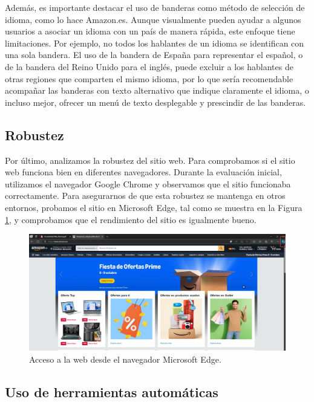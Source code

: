 \documentclass[letterpaper, 12pt]{report}
\begin{document}
Además, es importante destacar el uso de banderas como método de selección de idioma, como lo hace Amazon.es. Aunque visualmente pueden ayudar a algunos usuarios a asociar un idioma con un país de manera rápida, este enfoque tiene limitaciones. Por ejemplo, no todos los hablantes de un idioma se identifican con una sola bandera. El uso de la bandera de España para representar el español, o de la bandera del Reino Unido para el inglés, puede excluir a los hablantes de otras regiones que comparten el mismo idioma, por lo que sería recomendable acompañar las banderas con texto alternativo que indique claramente el idioma, o incluso mejor, ofrecer un menú de texto desplegable y prescindir de las banderas.

\subsection{Robustez}

Por último, analizamos la robustez del sitio web. Para comprobamos si el sitio web funciona bien en diferentes navegadores. Durante la evaluación inicial, utilizamos el navegador Google Chrome y observamos que el sitio funcionaba correctamente. Para asegurarnos de que esta robustez se mantenga en otros entornos, probamos el sitio en Microsoft Edge, tal como se muestra en la Figura \ref{fig:17}, y comprobamos que el rendimiento del sitio es igualmente bueno.

\begin{figure}[H]
\centering
\includegraphics[width=1\textwidth]{figure17.png}
\caption{Acceso a la web desde el navegador Microsoft Edge.}
\label{fig:17}
\end{figure}

\subsection{Uso de herramientas automáticas}
\end{document}
